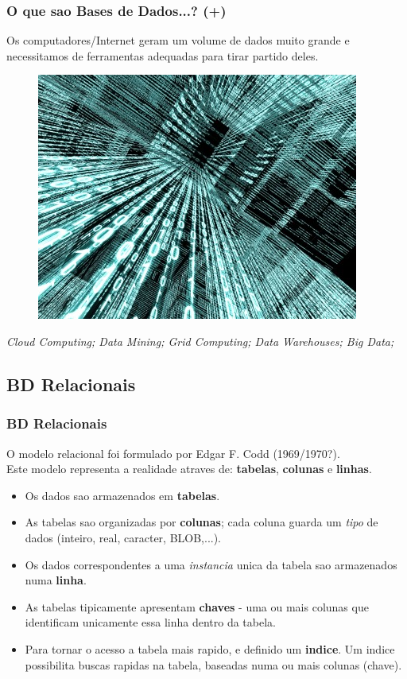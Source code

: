 \documentclass[hyperref={pdfpagelabels=true}]{beamer}
\begin{document}
\begin{frame}
\frametitle{O que sao Bases de Dados...? (+)}
\begin{overprint}
Os computadores/Internet geram um volume de dados muito grande e necessitamos de ferramentas adequadas para tirar partido deles.\\
\begin{figure}
\includegraphics[scale=0.4]{Big-Data-on-cloud.jpg}
\end{figure}
\end{overprint}
\textit{Cloud Computing; Data Mining; Grid Computing; Data Warehouses; Big Data;}
\end{frame}

\subsection{BD Relacionais}
\begin{frame}
\frametitle{BD Relacionais}
O modelo relacional foi formulado por Edgar F. Codd (1969/1970?).\\
Este modelo representa a realidade atraves de: \textbf{tabelas}, \textbf{colunas} e \textbf{linhas}.
  \begin{itemize}
  \item<2-> Os dados sao armazenados em \textbf{tabelas}.
  \item<3-> As tabelas sao organizadas por \textbf{colunas}; cada coluna guarda um \emph{tipo} de dados (inteiro, real, caracter, BLOB,...).  
  \item<4-> Os dados correspondentes a uma \textit{instancia} unica da tabela sao armazenados numa \textbf{linha}.
  \item<5-> As tabelas tipicamente apresentam \textbf{chaves} - uma ou mais colunas que identificam unicamente essa linha dentro da tabela.
  \item<6-> Para tornar o acesso a tabela mais rapido, e definido um \textbf{indice}. Um indice possibilita buscas rapidas na tabela, baseadas numa ou mais colunas (chave).
  \end{itemize}
\end{frame}
\end{document}

